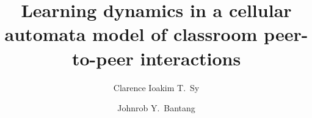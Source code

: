 \documentclass[10pt,a4paper,twoside]{article}
\begin{document}
\title{\TitleFont Learning dynamics in a cellular automata model of classroom peer-to-peer interactions}


\author[*\negthickspace]{Clarence Ioakim T.~Sy}
\author[ ]{Johnrob Y.~Bantang
\lastauthorsep}



\end{document}
